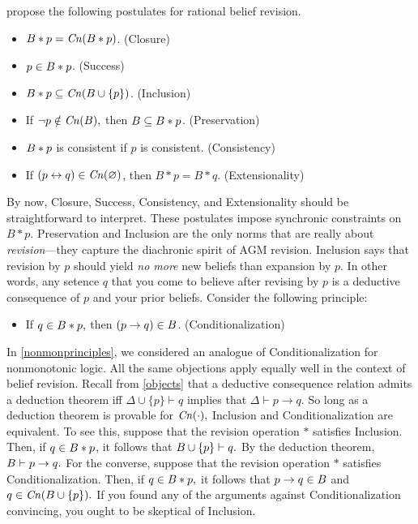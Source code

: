 \citet{alchourron1985logic} propose the following postulates for rational belief
revision.
\begin{itemize}
\item[] $B*p = \text{\textit{Cn}}(B*p)$. \hfill(Closure)
\item[] $p\in B*p$. \hfill(Success)
\item[] $B*p\subseteq \text{\textit{Cn}}(B \cup \{p\})$. \hfill(Inclusion)
\item[] If $\neg p \notin \text{\textit{Cn}}(B),$ then $B\subseteq B*p$.
\hfill(Preservation)
\item[] $B*p$ is consistent if $p$ is consistent. \hfill(Consistency)
\item[] If $(p\leftrightarrow q) \in \text{\textit{Cn}}(\varnothing)$, then $B*p=B*q$.
\hfill(Extensionality)
\end{itemize}
By now, Closure, Success, Consistency, and Extensionality should be
straightforward to interpret. These postulates impose synchronic constraints on
$B*p$. Preservation and Inclusion are the only norms that are really about {\em
revision}---they capture the diachronic spirit of AGM revision. Inclusion says
that revision by $p$ should yield {\em no more} new beliefs than expansion by
$p$. In other words, any setence $q$ that you come to believe after revising by
$p$ is a deductive consequence of $p$ and your prior beliefs.  Consider the
following principle:
\begin{itemize}
\item[] If $q\in B*p,$ then $(p\rightarrow q) \in B$.
\hfill(Conditionalization)
\end{itemize}
In \autoref{nonmonprinciples}, we considered an analogue of Conditionalization
for nonmonotonic logic. All the same objections apply equally well in the
context of belief revision. Recall from \autoref{objects} that a deductive
consequence relation admits a deduction theorem iff $\Delta \cup \{ p\} \vdash
q$ implies that $\Delta \vdash p\rightarrow q.$ So long as a deduction theorem
is provable for $\text{\textit{Cn}}(\cdot),$ Inclusion and Conditionalization are equivalent.
To see this, suppose that the revision operation $*$ satisfies Inclusion. Then,
if $q\in B*p$, it follows that $B\cup \{p\} \vdash q.$ By the deduction
theorem, $B\vdash p\rightarrow q.$ For the converse, suppose that the
revision operation $*$ satisfies Conditionalization. Then, if $q\in B*p,$ it
follows that $p\rightarrow q \in B$ and $q \in \text{\textit{Cn}}(B \cup \{p\}).$ If
you found any of the arguments against Conditionalization convincing, you ought
to be skeptical of Inclusion.

